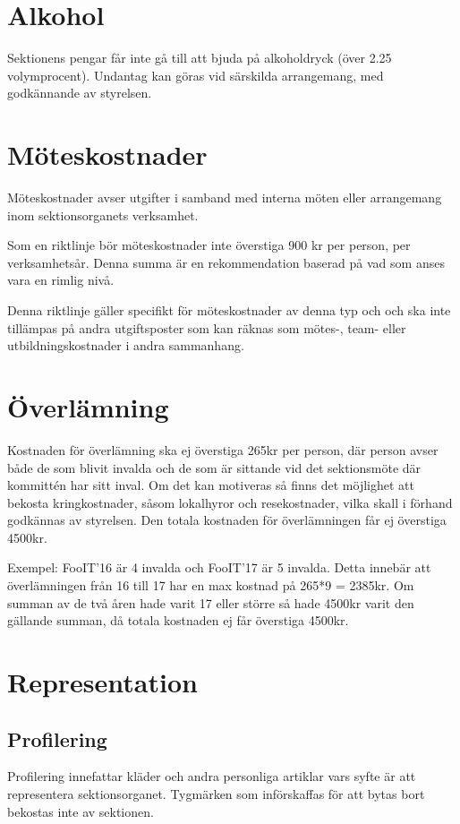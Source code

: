 \documentclass[11pt, includeaddress]{classes/cthit}
\begin{document}
\section{Alkohol}
Sektionens pengar får inte gå till att bjuda på alkoholdryck (över 2.25 volymprocent). Undantag kan göras vid särskilda arrangemang, med godkännande av styrelsen.

\section{Möteskostnader}
Möteskostnader avser utgifter i samband med interna möten eller arrangemang inom sektionsorganets verksamhet.

Som en riktlinje bör möteskostnader inte överstiga 900 kr per person, per verksamhetsår. Denna summa är en rekommendation baserad på vad som anses vara en rimlig nivå.

Denna riktlinje gäller specifikt för möteskostnader av denna typ och och ska inte tillämpas på andra utgiftsposter som kan räknas som mötes-, team- eller utbildningskostnader i andra sammanhang.

\section{Överlämning}
Kostnaden för överlämning ska ej överstiga 265kr per person, där person avser både de som blivit invalda och de som är sittande vid det sektionsmöte där kommittén har sitt inval. Om det kan motiveras så finns det möjlighet att bekosta kringkostnader, såsom lokalhyror och resekostnader, vilka skall i förhand godkännas av styrelsen. Den totala kostnaden för överlämningen får ej överstiga 4500kr.

Exempel: FooIT’16 är 4 invalda och FooIT’17 är 5 invalda. Detta innebär att överlämningen från 16 till 17 har en max kostnad på 265*9 = 2385kr. Om summan av de två åren hade varit 17 eller större så hade 4500kr varit den gällande summan, då totala kostnaden ej får överstiga 4500kr.

\section{Representation}

\subsection{Profilering}
Profilering innefattar kläder och andra personliga artiklar vars syfte är att representera sektionsorganet. 
Tygmärken som införskaffas för att bytas bort bekostas inte av sektionen. \\
\end{document}
